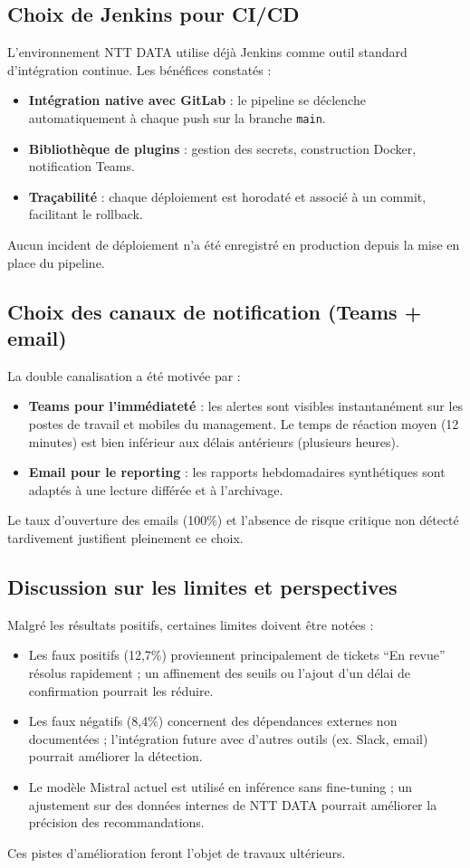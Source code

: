 \subsection{Choix de Jenkins pour CI/CD}
L’environnement NTT DATA utilise déjà Jenkins comme outil standard d’intégration continue. Les bénéfices constatés :
\begin{itemize}
    \renewcommand{\labelitemi}{—}
    \item \textbf{Intégration native avec GitLab} : le pipeline se déclenche automatiquement à chaque push sur la branche \texttt{main}.
    \item \textbf{Bibliothèque de plugins} : gestion des secrets, construction Docker, notification Teams.
    \item \textbf{Traçabilité} : chaque déploiement est horodaté et associé à un commit, facilitant le rollback.
\end{itemize}
Aucun incident de déploiement n’a été enregistré en production depuis la mise en place du pipeline.

\subsection{Choix des canaux de notification (Teams + email)}
La double canalisation a été motivée par :
\begin{itemize}
    \renewcommand{\labelitemi}{—}
    \item \textbf{Teams pour l’immédiateté} : les alertes sont visibles instantanément sur les postes de travail et mobiles du management. Le temps de réaction moyen (12 minutes) est bien inférieur aux délais antérieurs (plusieurs heures).
    \item \textbf{Email pour le reporting} : les rapports hebdomadaires synthétiques sont adaptés à une lecture différée et à l’archivage.
\end{itemize}
Le taux d’ouverture des emails (100\%) et l’absence de risque critique non détecté tardivement justifient pleinement ce choix.

\subsection{Discussion sur les limites et perspectives}
Malgré les résultats positifs, certaines limites doivent être notées :
\begin{itemize}
    \renewcommand{\labelitemi}{—}
    \item Les faux positifs (12,7\%) proviennent principalement de tickets “En revue” résolus rapidement ; un affinement des seuils ou l’ajout d’un délai de confirmation pourrait les réduire.
    \item Les faux négatifs (8,4\%) concernent des dépendances externes non documentées ; l’intégration future avec d’autres outils (ex. Slack, email) pourrait améliorer la détection.
    \item Le modèle Mistral actuel est utilisé en inférence sans fine‑tuning ; un ajustement sur des données internes de NTT DATA pourrait améliorer la précision des recommandations.
\end{itemize}
Ces pistes d’amélioration feront l’objet de travaux ultérieurs.


